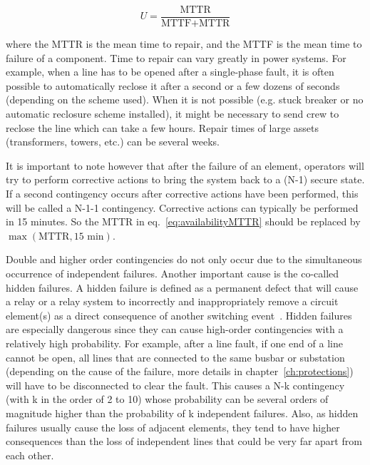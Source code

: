 \begin{equation}
\label{eq:availabilityMTTR}
    U = \frac{\text{MTTR}}{\text{MTTF} + \text{MTTR}}
\end{equation}


where the MTTR is the mean time to repair, and the MTTF is the mean time to failure of a component. Time to repair can vary greatly in power systems. For example, when a line has to be opened after a single-phase fault, it is often possible to automatically reclose it after a second or a few dozens of seconds (depending on the scheme used). When it is not possible (e.g. stuck breaker or no automatic reclosure scheme installed), it might be necessary to send crew to reclose the line which can take a few hours. Repair times of large assets (transformers, towers, etc.) can be several weeks.

It is important to note however that after the failure of an element, operators will try to perform corrective actions to bring the system back to a (N-1) secure state. If a second contingency occurs after corrective actions have been performed, this will be called a N-1-1 contingency. Corrective actions can typically be performed in 15 minutes. So the MTTR in eq.~\ref{eq:availabilityMTTR} should be replaced by \(\max(\text{MTTR}, 15\text{~min})\).



Double and higher order contingencies do not only occur due to the simultaneous occurrence of independent failures. Another important cause is the co-called hidden failures. A hidden failure is defined as a permanent defect that will cause a relay or a relay system to incorrectly and inappropriately remove a circuit element(s) as a direct consequence of another switching event~\cite{ZoneVulnerability}. Hidden failures are especially dangerous since they can cause high-order contingencies with a relatively high probability. For example, after a line fault, if one end of a line cannot be open, all lines that are connected to the same busbar or substation (depending on the cause of the failure, more details in chapter~\ref{ch:protections}) will have to be disconnected to clear the fault. This causes a N-k contingency (with k in the order of 2 to 10) whose probability can be several orders of magnitude higher than the probability of k independent failures. Also, as hidden failures usually cause the loss of adjacent elements, they tend to have higher consequences than the loss of independent lines that could be very far apart from each other.

